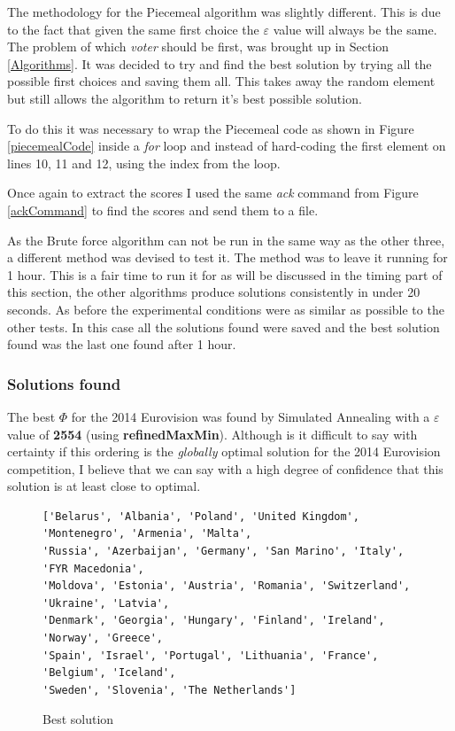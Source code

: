 \documentclass[12pt]{report}
\begin{document}
The methodology for the Piecemeal algorithm was slightly different. This is due to the fact that given the same first choice the $\varepsilon$ value will always be the same. The problem of which \textit{voter} should be first, was brought up in Section \ref{Algorithms}. It was decided to try and find the best solution by trying all the possible first choices and saving them all. This takes away the random element but still allows the algorithm to return it's best possible solution.

To do this it was necessary to wrap the Piecemeal code as shown in Figure \ref{piecemealCode} inside a \textit{for} loop and instead of hard-coding the first element on lines 10, 11 and 12, using the index from the loop.

Once again to extract the scores I used the same \textit{ack} command from Figure \ref{ackCommand} to find the scores and send them to a file.

As the Brute force algorithm can not be run in the same way as the other three, a different method was devised to test it. The method was to leave it running for 1 hour. This is a fair time to run it for as will be discussed in the timing part of this section, the other algorithms produce solutions consistently in under 20 seconds. As before the experimental conditions were as similar as possible to the other tests. In this case all the solutions found were saved and the best solution found was the last one found after 1 hour.


\subsubsection{Solutions found}
The best $\Phi$ for the 2014 Eurovision was found by Simulated Annealing with a $\varepsilon$ value of \textbf{2554} (using \textbf{refinedMaxMin}). Although is it difficult to say with certainty if this ordering is the \textit{globally} optimal solution for the 2014 Eurovision competition, I believe that we can say with a high degree of confidence that this solution is at least close to optimal.

\begin{figure}[H]
\caption{Best solution}
\label{bestSolution}
\begin{verbatim}
['Belarus', 'Albania', 'Poland', 'United Kingdom', 'Montenegro', 'Armenia', 'Malta', 
'Russia', 'Azerbaijan', 'Germany', 'San Marino', 'Italy', 'FYR Macedonia', 
'Moldova', 'Estonia', 'Austria', 'Romania', 'Switzerland', 'Ukraine', 'Latvia', 
'Denmark', 'Georgia', 'Hungary', 'Finland', 'Ireland', 'Norway', 'Greece', 
'Spain', 'Israel', 'Portugal', 'Lithuania', 'France', 'Belgium', 'Iceland', 
'Sweden', 'Slovenia', 'The Netherlands']
\end{verbatim}
\end{figure}
\end{document}
